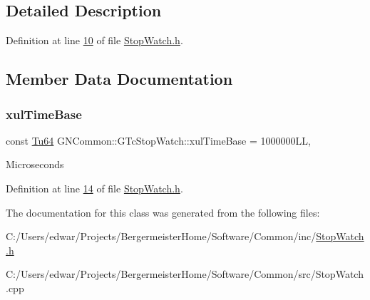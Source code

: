 \subsection{Detailed Description}


Definition at line \mbox{\hyperlink{_stop_watch_8h_source_l00010}{10}} of file \mbox{\hyperlink{_stop_watch_8h_source}{Stop\+Watch.\+h}}.



\subsection{Member Data Documentation}
\mbox{\label{class_g_n_common_1_1_g_tc_stop_watch_a525b6eebced7d4d9c3812788cfde2b75}} 
\subsubsection{\texorpdfstring{xul\+Time\+Base}{xulTimeBase}}
{\footnotesize\ttfamily const \mbox{\hyperlink{namespace_g_n_common_a9404ee6090c788ae70aebd1436ceb97d}{Tu64}} G\+N\+Common\+::\+G\+Tc\+Stop\+Watch\+::xul\+Time\+Base = 1000000\+LL\hspace{0.3cm}{\ttfamily [static]}, {\ttfamily [protected]}}

Microseconds 

Definition at line \mbox{\hyperlink{_stop_watch_8h_source_l00014}{14}} of file \mbox{\hyperlink{_stop_watch_8h_source}{Stop\+Watch.\+h}}.



The documentation for this class was generated from the following files\+:\begin{DoxyCompactItemize}
\item 
C\+:/\+Users/edwar/\+Projects/\+Bergermeister\+Home/\+Software/\+Common/inc/\mbox{\hyperlink{_stop_watch_8h}{Stop\+Watch.\+h}}\item 
C\+:/\+Users/edwar/\+Projects/\+Bergermeister\+Home/\+Software/\+Common/src/Stop\+Watch.\+cpp\end{DoxyCompactItemize}
